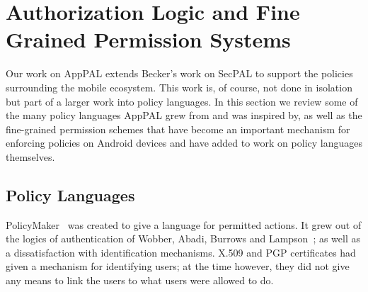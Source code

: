 \documentclass[thesis.tex]{subfiles}
\begin{document}
%

\section{Authorization Logic and Fine Grained Permission Systems}
\label{sec:authorization-logic}

Our work on AppPAL extends Becker's work on SecPAL to support the
policies surrounding the mobile ecosystem.  This work is, of course,
not done in isolation but part of a larger work into policy languages.
In this section we review some of the many policy languages AppPAL
grew from and was inspired by, as well as the fine-grained permission
schemes that have become an important mechanism for enforcing policies
on Android devices and have added to work on policy languages
themselves.


\subsection{Policy Languages}

PolicyMaker~\cite{blaze_decentralized_1996} was created to give a
language for permitted actions.  It grew out of the logics of
authentication of Wobber, Abadi, Burrows and Lampson~\cite{wobber_authentication_1994,abadi_calculus_1991}; as well as a
dissatisfaction with identification mechanisms.  X.509 and PGP
certificates had given a mechanism for identifying users; at the time
however, they did not give any means to link the users to what users
were allowed to do.
\end{document}
